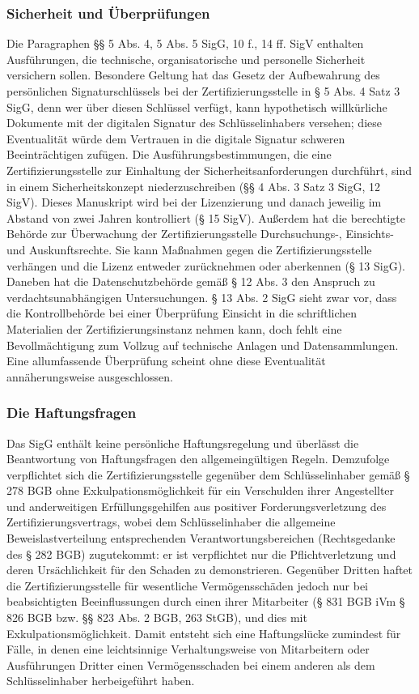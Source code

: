 \subsubsection{Sicherheit und Überprüfungen}
Die Paragraphen §§ 5 Abs. 4, 5 Abs. 5 SigG, 10 f., 14 ff. SigV enthalten Ausführungen, die technische, organisatorische und personelle Sicherheit versichern sollen. Besondere Geltung hat das Gesetz der Aufbewahrung des persönlichen Signaturschlüssels bei der Zertifizierungsstelle in § 5 Abs. 4 Satz 3 SigG, denn wer über diesen Schlüssel verfügt, kann hypothetisch willkürliche Dokumente mit der digitalen Signatur des Schlüsselinhabers versehen; diese Eventualität würde dem Vertrauen in die digitale Signatur schweren Beeinträchtigen zufügen. Die Ausführungsbestimmungen, die eine Zertifizierungsstelle zur Einhaltung der Sicherheitsanforderungen durchführt, sind in einem Sicherheitskonzept niederzuschreiben (§§ 4 Abs. 3 Satz 3 SigG, 12 SigV). Dieses Manuskript wird bei der Lizenzierung und danach jeweilig im Abstand von zwei Jahren kontrolliert (§ 15 SigV). Außerdem hat die berechtigte Behörde zur Überwachung der Zertifizierungsstelle Durchsuchungs-, Einsichts- und Auskunftsrechte. Sie kann Maßnahmen gegen die Zertifizierungsstelle verhängen und die Lizenz entweder zurücknehmen oder aberkennen (§ 13 SigG). Daneben hat die Datenschutzbehörde gemäß § 12 Abs. 3 den Anspruch zu verdachtsunabhängigen Untersuchungen. § 13 Abs. 2 SigG sieht zwar vor, dass die Kontrollbehörde bei einer Überprüfung Einsicht in die schriftlichen Materialien der Zertifizierungsinstanz nehmen kann, doch fehlt eine Bevollmächtigung zum Vollzug auf technische Anlagen und Datensammlungen. Eine allumfassende Überprüfung scheint ohne diese Eventualität annäherungsweise ausgeschlossen.


\subsubsection{Die Haftungsfragen}
Das SigG enthält keine persönliche Haftungsregelung und überlässt die Beantwortung von Haftungsfragen den allgemeingültigen Regeln. Demzufolge verpflichtet sich die Zertifizierungsstelle gegenüber dem Schlüsselinhaber gemäß § 278 BGB ohne Exkulpationsmöglichkeit für ein Verschulden ihrer Angestellter und anderweitigen Erfüllungsgehilfen aus positiver Forderungsverletzung des Zertifizierungsvertrags, wobei dem Schlüsselinhaber die allgemeine Beweislastverteilung entsprechenden Verantwortungsbereichen (Rechtsgedanke des § 282 BGB) zugutekommt: er ist verpflichtet nur die Pflichtverletzung und deren Ursächlichkeit für den Schaden zu demonstrieren. Gegenüber Dritten haftet die Zertifizierungsstelle für wesentliche Vermögensschäden jedoch nur bei beabsichtigten Beeinflussungen durch einen ihrer Mitarbeiter (§ 831 BGB iVm § 826 BGB bzw. §§ 823 Abs. 2 BGB, 263 StGB), und dies mit Exkulpationsmöglichkeit. Damit entsteht sich eine Haftungslücke zumindest für Fälle, in denen eine leichtsinnige Verhaltungsweise von Mitarbeitern oder Ausführungen Dritter einen Vermögensschaden bei einem anderen als dem Schlüsselinhaber herbeigeführt haben.\\

